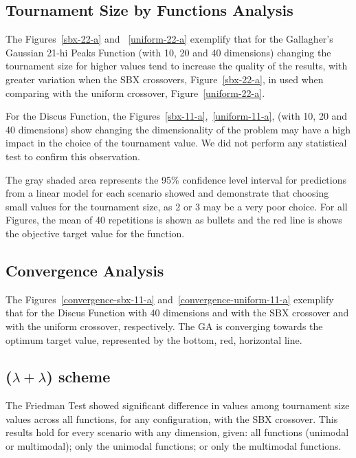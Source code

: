 \subsection{Tournament Size by Functions Analysis}
The Figures~\ref{sbx-22-a} and ~\ref{uniform-22-a} exemplify that for the Gallagher's Gaussian 21-hi Peaks Function (with 10, 20 and 40 dimensions) changing the tournament size for higher values tend to increase the quality of the results, with greater variation when the SBX crossovers, Figure~\ref{sbx-22-a}, in used when comparing with the uniform crossover, Figure~\ref{uniform-22-a}.

For the Discus Function, the Figures~\ref{sbx-11-a},~\ref{uniform-11-a}, (with 10, 20 and 40 dimensions) show  changing the dimensionality of the problem may have a high impact in the choice of the tournament value. We did not perform any statistical test to confirm this observation.

The gray shaded area represents the 95\% confidence level interval for predictions from a linear model for each scenario showed and demonstrate that choosing small values for the tournament size, as 2 or 3 may be a very poor choice. For all Figures, the mean of 40 repetitions is shown as bullets and the red line is shows the objective target value for the function.


\subsection{Convergence Analysis}
The Figures~\ref{convergence-sbx-11-a} and~\ref{convergence-uniform-11-a} exemplify that for the Discus Function with 40 dimensions and with the SBX crossover and with the uniform crossover, respectively. The GA is converging towards the optimum target value, represented by the bottom, red, horizontal line. %




\subsection{($\lambda + \lambda$) scheme}


The Friedman Test showed significant difference in values among tournament size values across all functions, for any configuration, with the SBX crossover. This results hold for every scenario with any dimension, given: all functions (unimodal or multimodal); only the unimodal functions; or only the multimodal functions. 

